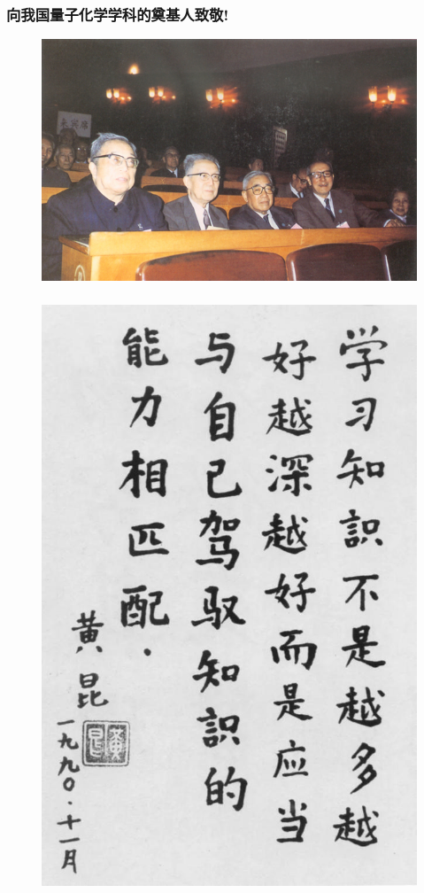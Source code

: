 \frame
{
	\frametitle{向我国量子化学学科的奠基人致敬!}
\begin{figure}[h!]
	\centering
\centering
\vspace{-10.5pt}
\includegraphics[height=0.58\textwidth,width=1.01\textwidth,viewport=0 0 435 250,clip]{Figures/1994_6_5.jpg}
\caption{\fontsize{6.3pt}{5.2pt}}
\label{Tang_Wu_Lu_Xu}
\end{figure}
}

\frame
{
	\frametitle{}
\begin{figure}[h!]
\centering
\vspace{-5.5pt}
\includegraphics[height=0.65\textwidth]{Figures/Quote-Huang_Kun.jpg}
\caption{\fontsize{6.2pt}{5.2pt}\selectfont{黄~~昆~教授的治学箴言}}
\label{Quote-Huang_Kun}
\end{figure}
}


